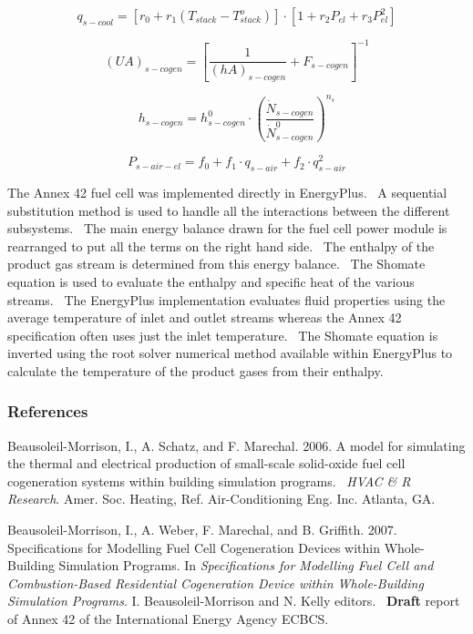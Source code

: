 \begin{equation}
{q_{s - cool}} = \left[ {{r_0} + {r_1}\left( {{T_{stack}} - T_{stack}^o} \right)} \right] \cdot \left[ {1 + {r_2}{P_{el}} + {r_3}P_{el}^2} \right]
\end{equation}

\begin{equation}
{\left( {UA} \right)_{s - cogen}} = {\left[ {\frac{1}{{{{\left( {hA} \right)}_{s - cogen}}}} + {F_{s - cogen}}} \right]^{ - 1}}
\end{equation}

\begin{equation}
{h_{s - cogen}} = h_{s - cogen}^0 \cdot {\left( {\frac{{{{\dot N}_{s - cogen}}}}{{\dot N_{s - cogen}^0}}} \right)^{{n_s}}}
\end{equation}

\begin{equation}
{P_{s - air - el}} = {f_0} + {f_1} \cdot {q_{s - air}} + {f_2} \cdot q_{s - air}^2
\end{equation}

The Annex 42 fuel cell was implemented directly in EnergyPlus.~ A sequential substitution method is used to handle all the interactions between the different subsystems.~ The main energy balance drawn for the fuel cell power module is rearranged to put all the terms on the right hand side.~ The enthalpy of the product gas stream is determined from this energy balance.~ The Shomate equation is used to evaluate the enthalpy and specific heat of the various streams.~ The EnergyPlus implementation evaluates fluid properties using the average temperature of inlet and outlet streams whereas the Annex 42 specification often uses just the inlet temperature.~ The Shomate equation is inverted using the root solver numerical method available within EnergyPlus to calculate the temperature of the product gases from their enthalpy.

\subsubsection{References}\label{references-1-009}

Beausoleil-Morrison, I., A. Schatz, and F. Marechal. 2006. A model for simulating the thermal and electrical production of small-scale solid-oxide fuel cell cogeneration systems within building simulation programs.~ \emph{HVAC \& R Research}. Amer. Soc. Heating, Ref. Air-Conditioning Eng. Inc. Atlanta, GA.

Beausoleil-Morrison, I., A. Weber, F. Marechal, and B. Griffith. 2007. Specifications for Modelling Fuel Cell Cogeneration Devices within Whole-Building Simulation Programs. In \emph{Specifications for Modelling Fuel Cell and Combustion-Based Residential Cogeneration Device within Whole-Building Simulation Programs}. I. Beausoleil-Morrison and N. Kelly editors.~ \textbf{Draft} report of Annex 42 of the International Energy Agency ECBCS.


